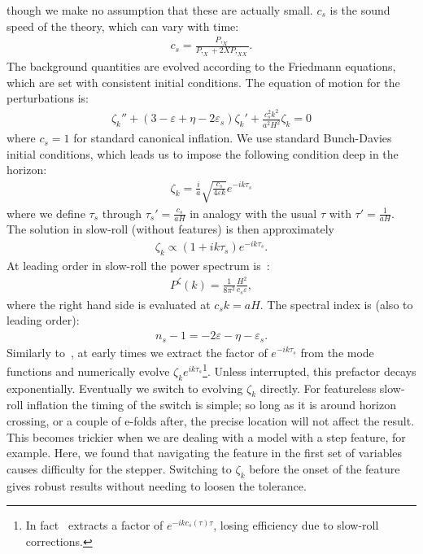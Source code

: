 though we make no assumption that these are actually small.
$c_s$ is the sound speed of the theory, which can vary with time:
\begin{align}
c_s=\frac{P,_X}{P,_X+2XP,_{XX}}.
\end{align}
The background quantities are evolved according to the Friedmann equations,
which are set with consistent initial conditions.
The equation of motion for the perturbations is:
\begin{align}\label{modefneqn}
\zeta_k''+(3-\varepsilon+\eta-2\varepsilon_s)\zeta_k'+\frac{c_s^2k^2}{a^2H^2}\zeta_k=0
\end{align}
where $c_s=1$ for standard canonical inflation.
We use standard Bunch-Davies initial conditions,
which leads us to impose the following condition deep in the horizon:
\begin{align}\label{bd_ic}
\zeta_k = \frac{i}{a}\sqrt{\frac{c_s}{4\varepsilon k}} e^{-ik\tau_s}
\end{align}
where we define $\tau_s$ through $\tau_s'=\frac{c_s}{aH}$
in analogy with the usual $\tau$ with $\tau'=\frac{1}{aH}$.
The solution in slow-roll (without features) is then approximately
\begin{align}\label{modefnsapprox}
    \zeta_k \propto (1+ik\tau_s)e^{-ik\tau_s}.
\end{align}
At leading order in slow-roll the power spectrum is~\cite{mukhanov_1999,chen_ng_0605}:
\begin{align}
P^{\zeta}(k) = \frac{1}{8\pi^2}\frac{H^2}{c_s\varepsilon},
\end{align}
where the right hand side is evaluated at $c_{s}k=aH$.
The spectral index is (also to leading order):
\begin{align}
n_s-1 = -2\varepsilon-\eta-\varepsilon_s.
\end{align}
Similarly to~\cite{Funakoshi}, at early times we extract the factor of $e^{-ik\tau_s}$ from the mode functions
and numerically evolve $\zeta_ke^{ik\tau_s}$\footnote{
    In fact~\cite{Funakoshi} extracts a factor of $e^{-ikc_s(\tau)\tau}$, losing efficiency
    due to slow-roll corrections.
}.
Unless interrupted, this prefactor decays exponentially.
Eventually we switch to evolving $\zeta_k$ directly.
For featureless slow-roll inflation the timing of the switch is simple;
so long as it is around horizon crossing, or a couple of e-folds after,
the precise location will not affect the result.
This becomes trickier when we are dealing with a model with
a step feature, for example.
Here, we found that navigating the feature in the first set of variables
causes difficulty for the stepper.
Switching to $\zeta_k$ before the onset of the feature
gives robust results without needing to loosen the tolerance.


